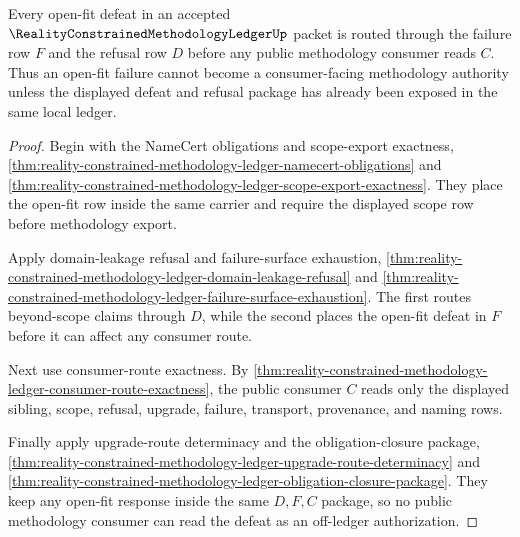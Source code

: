 \begin{theorem}
\label{thm:reality-constrained-methodology-ledger-root-open-fit-refusal-package}
Every open-fit defeat in an accepted $\RealityConstrainedMethodologyLedgerUp$
packet is routed through the failure row $F$ and the refusal row $D$ before any
public methodology consumer reads $C$. Thus an open-fit failure cannot become a
consumer-facing methodology authority unless the displayed defeat and refusal
package has already been exposed in the same local ledger.
\end{theorem}
\begin{proof}
Begin with the NameCert obligations and scope-export exactness,
\autoref{thm:reality-constrained-methodology-ledger-namecert-obligations} and
\autoref{thm:reality-constrained-methodology-ledger-scope-export-exactness}.
They place the open-fit row inside the same carrier and require the displayed
scope row before methodology export.

Apply domain-leakage refusal and failure-surface exhaustion,
\autoref{thm:reality-constrained-methodology-ledger-domain-leakage-refusal} and
\autoref{thm:reality-constrained-methodology-ledger-failure-surface-exhaustion}.
The first routes beyond-scope claims through $D$, while the second places the
open-fit defeat in $F$ before it can affect any consumer route.

Next use consumer-route exactness. By
\autoref{thm:reality-constrained-methodology-ledger-consumer-route-exactness},
the public consumer $C$ reads only the displayed sibling, scope, refusal,
upgrade, failure, transport, provenance, and naming rows.

Finally apply upgrade-route determinacy and the obligation-closure package,
\autoref{thm:reality-constrained-methodology-ledger-upgrade-route-determinacy}
and
\autoref{thm:reality-constrained-methodology-ledger-obligation-closure-package}.
They keep any open-fit response inside the same $D,F,C$ package, so no public
methodology consumer can read the defeat as an off-ledger authorization.
\end{proof}

